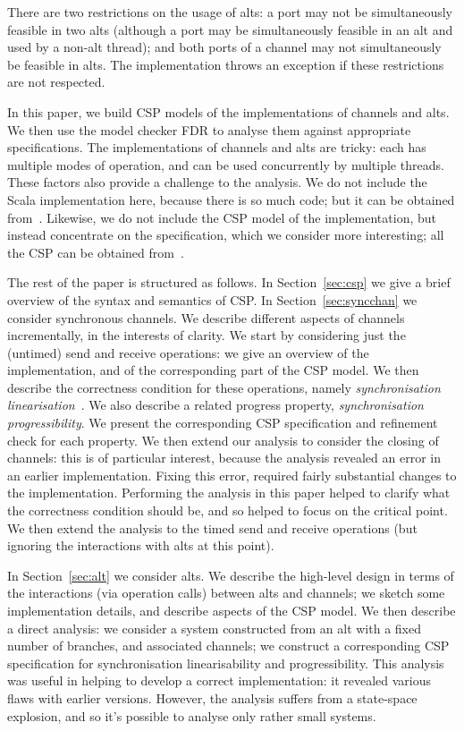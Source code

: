 There are two restrictions on the usage of alts: a port may not be
simultaneously feasible in two alts (although a port may be simultaneously
feasible in an alt and used by a non-alt thread); and both ports of a channel
may not simultaneously be feasible in alts.  The implementation throws an
exception if these restrictions are not respected.

In this paper, we build CSP models of the implementations of channels and
alts.  We then use the model checker FDR to analyse them against appropriate
specifications. 
%
The implementations of channels and alts are tricky: each has multiple modes
of operation, and can be used concurrently by multiple threads.  These factors
also provide a challenge to the analysis.
%
We do not include the Scala implementation here, because there is so much
code; but it can be obtained from~.  Likewise, we do not include
the CSP model of the implementation, but instead concentrate on the
specification, which we consider more interesting; all the CSP can be obtained
from~.

The rest of the paper is structured as follows.  In Section~\ref{sec:csp} we
give a brief overview of the syntax and semantics of CSP\@.  In
Section~\ref{sec:syncchan} we consider synchronous channels.  We describe
different aspects of channels incrementally, in the interests of clarity.  We
start by considering just the (untimed) send and receive operations: we give
an overview of the implementation, and of the corresponding part of the CSP
model.  We then describe the correctness condition for these operations,
namely \emph{synchronisation linearisation}~\cite{LL:synchronisation}.  We
also describe a related progress property, \emph{synchronisation
  progressibility}.  We present the corresponding CSP specification and
refinement check for each property.  We then extend our analysis to consider
the closing of channels: this is of particular interest, because the analysis
revealed an error in an earlier implementation.  Fixing this error, required
fairly substantial changes to the implementation.  Performing the analysis in
this paper helped to clarify what the correctness condition should be, and so
helped to focus on the critical point.  We then extend the analysis to the
timed send and receive operations (but ignoring the interactions with alts at
this point).

In Section~\ref{sec:alt} we consider alts.  We describe the high-level design
in terms of the interactions (via operation calls) between alts and channels;
we  sketch some implementation details, and describe aspects of the CSP
model.  We then describe a direct analysis: we consider a system constructed
from an alt with a fixed number of branches, and associated channels; we
construct a corresponding CSP specification for synchronisation
linearisability and progressibility.  This analysis was useful in helping to
develop a correct implementation: it revealed various flaws with earlier
versions.  However, the analysis suffers from a state-space explosion, and so
it's possible to analyse only rather small systems.

